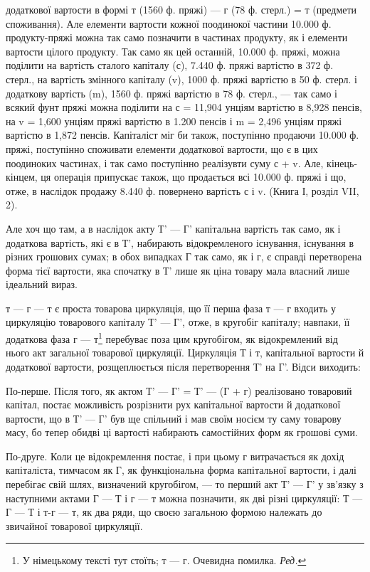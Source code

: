 \parcont{}  %
додаткової вартости в формі т (1560 ф. пряжі) — г (78 ф. стерл.) = т
(предмети споживання). Але елементи вартости кожної поодинокої частини
10.000  ф. продукту-пряжі можна так само позначити в частинах продукту,
як і елементи вартости цілого продукту. Так само як цей останній, 10.000 ф. пряжі, можна поділити на
вартість сталого капіталу (с), 7.440 ф.
пряжі вартістю в 372 ф. стерл., на вартість змінного капіталу (v), 1000 ф.
пряжі вартістю в 50 ф. стерл. і додаткову вартість (m), 1560 ф. пряжі
вартістю в 78 ф. стерл., — так само і всякий фунт пряжі можна поділити
на с = 11,904 унціям вартістю в 8,928 пенсів, на v = 1,600 унціям пряжі
вартістю в 1.200 пенсів і m = 2,496 унціям пряжі вартістю в 1,872 пенсів.
Капіталіст міг би також, поступінно продаючи 10.000 ф. пряжі, поступінно
споживати елементи додаткової вартости, що є в цих поодиноких частинах,
і так само поступінно реалізувти суму с + v. Але, кінець-кінцем, ця операція
припускає також, що продається всі 10.000 ф. пряжі і що, отже, в наслідок
продажу 8.440 ф. повернено вартість с і v. (Книга І, розділ VII, 2).

Але хоч що там, а в наслідок акту Т' — Г' капітальна вартість так
само, як і додаткова вартість, які є в Т', набирають відокремленого
існування, існування в різних грошових сумах; в обох випадках Г так
само, як і г, є справді перетворена форма тієї вартости, яка спочатку
в Т' лише як ціна товару мала власний лише ідеальний вираз.

т — г — т є проста товарова циркуляція, що її перша фаза т — г входить
у циркуляцію товарового капіталу Т' — Г', отже, в кругобіг капіталу;
навпаки, її додаткова фаза г — т\footnote*{
У німецькому тексті тут стоїть; т — г. Очевидна помилка. \emph{Ред.}
} перебуває поза цим кругобігом, як
відокремлений від нього акт загальної товарової циркуляції. Циркуляція
Т і т, капітальної вартости й додаткової вартости, розщеплюється після
перетворення Т' на Г'. Відси виходить:

По-перше. Після того, як актом Т' — Г' = Т' — (Г + г) реалізовано
товаровий капітал, постає можливість розрізнити рух капітальної
вартости й додаткової вартости, що в Т' — Г' був ще спільний і мав своїм
носієм ту саму товарову масу, бо тепер обидві ці вартості набирають
самостійних форм як грошові суми.

По-друге. Коли це відокремлення постає, і при цьому г витрачається
як дохід капіталіста, тимчасом як Г, як функціональна форма капітальної
вартости, і далі перебігає свій шлях, визначений кругобігом, — то перший
акт Т' — Г' у зв’язку з наступними актами Г — Т і г — т можна позначити,
як дві різні циркуляції: Т — Г — Т і т-г — т, як два ряди, що своєю
загальною формою належать до звичайної товарової циркуляції.

